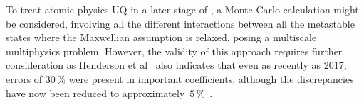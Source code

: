 
To treat atomic physics UQ in a later stage of \nep, a
Monte-Carlo calculation might be considered, involving all the
different interactions between all the metastable states where the Maxwellian
assumption is relaxed, posing a multiscale multiphysics problem.
However, the validity of this approach requires further consideration
as Henderson et al~\cite{He17Opti} also indicates that even as
recently as 2017, errors of 30\,\% were present in important coefficients,
although the discrepancies have now been reduced to approximately~$5$\,\%~\cite{He18Impr}.

%
%
%
%
%
